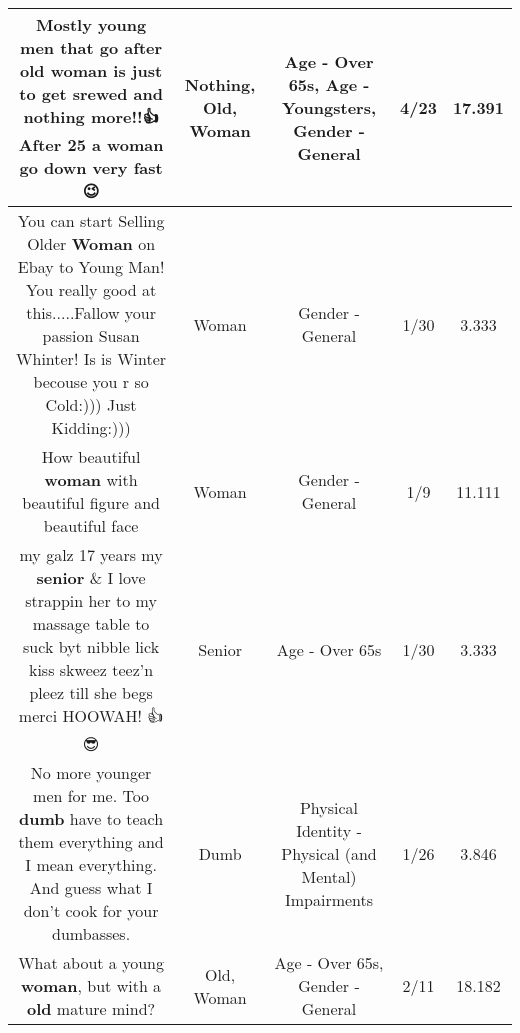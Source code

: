 \documentclass[11pt]{article}
\newlength\mylength
\begin{document}
\begin{center}
\begin{longtable}{|C{.65\mylength}|C{.30\mylength}|C{.12\mylength}|C{.12\mylength}|C{.12\mylength}|}
  \small Mostly young men that go after \textbf{old} \textbf{woman} is just to get srewed and \textbf{nothing} more!!👍After 25 a \textbf{woman} go down very fast😉\normalsize   & Nothing, Old, Woman & Age - Over 65s, Age - Youngsters, Gender - General & 4/23 & 17.391 \\  \hline
  \small You can start Selling Older \textbf{Woman} on Ebay to Young Man! You really good at this.....Fallow your passion Susan Whinter! Is is Winter becouse you r so Cold:))) Just Kidding:)))\normalsize   & Woman & Gender - General & 1/30 & 3.333 \\  \hline
  \small How beautiful \textbf{woman} with beautiful figure and beautiful face\normalsize   & Woman & Gender - General & 1/9 & 11.111 \\  \hline
  \small my galz 17 years my \textbf{senior} \& I love strappin her to my massage table to suck byt nibble lick kiss skweez teez'n pleez till she begs merci    HOOWAH!    👍😎\normalsize   & Senior & Age - Over 65s & 1/30 & 3.333 \\  \hline
  \small No more younger men for me. Too \textbf{dumb} have to teach them everything and I mean everything. And guess what I don't cook for your dumbasses.\normalsize   & Dumb & Physical Identity - Physical (and Mental) Impairments & 1/26 & 3.846 \\  \hline
  \small What about a young \textbf{woman}, but with a \textbf{old} mature mind?\normalsize   & Old, Woman & Age - Over 65s, Gender - General & 2/11 & 18.182 \\  \hline

\end{longtable}
\end{center}
\end{document}
